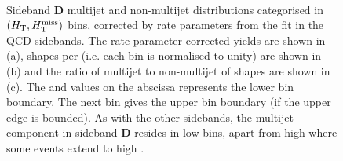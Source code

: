 \begin{figure}[!h]
  \centering
   \\
  \caption{Sideband \textbf{D} multijet and non-multijet distributions
    categorised in $(\mbox{$H_\text{T}$}, \mbox{$H_{\rm T}^{\rm miss}$})$ bins, corrected by rate parameters
    from the fit in the QCD sidebands. The rate parameter corrected yields
    are shown in (a), \HTmiss shapes per \scalht (i.e. each \scalht bin is normalised
    to unity) are shown in (b) and the ratio of multijet to non-multijet of
    \HTmiss shapes are shown in (c). The \scalht and \HTmiss values on the 
    abscissa represents the lower bin boundary. The next bin gives the upper
    bin boundary (if the upper edge is bounded). As with the other sidebands,
    the multijet component in sideband \textbf{D} resides in low \HTmiss
    bins, apart from high \scalht where some events extend to high \HTmiss.}
  \label{fig:qcd_mht_shapes_doublesb}
\end{figure}
